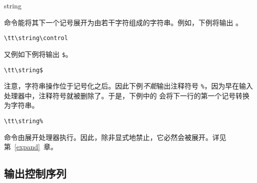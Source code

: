 \documentclass{book}
\begin{document}
 \cstoidx string\par 命令能将其下一个记号展开为由若干字符组成的字符串。例如，下例将输出 。
\begin{verbatim}
\tt\string\control
\end{verbatim}
又例如下例将输出 \verb-$-。
\begin{verbatim}
\tt\string$
\end{verbatim}
注意，字符串操作位于记号化之后。因此下例\emph{不能}输出注释符号 \verb.%.，因为早在输入处理器中，注释符号就被删除了。于是，下例中的  会将下一行的第一个记号转换为字符串。
\begin{verbatim}
\tt\string%
\end{verbatim}

 命令由展开处理器执行。因此，除非显式地禁止，它必然会被展开。详见第~\ref{expand}~章。

\subsection{输出控制序列}
\end{document}
